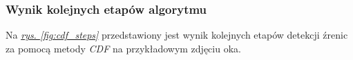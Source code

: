 \subsubsection{Wynik kolejnych etapów algorytmu}
Na \hyperref[{fig:cdf_steps}]{\textit{rys. \ref{fig:cdf_steps}}} przedstawiony jest wynik kolejnych etapów detekcji źrenic za pomocą metody \textit{CDF} na przykładowym zdjęciu oka.

